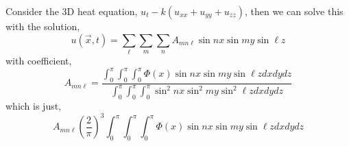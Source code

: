\begin{eg}
  Consider the $3$D heat equation, $u_t - k(u_{xx} + u_{yy} + u_{zz})$, then we can solve this with the solution,
  $$ u(\vec x, t) = \sum_\ell \sum_m \sum_n A_{mn\ell} \sin nx \sin my \sin \ell z $$
  with coefficient,
  $$ A_{mn\ell} = \frac{\int_0^\pi\int_0^\pi\int_0^\pi \Phi(x)\sin nx \sin my \sin \ell z dxdydz}{\int_0^\pi\int_0^\pi\int_0^\pi \sin^2 nx \sin^2 my \sin^2 \ell z dxdydz} $$
  which is just,
  $$ A_{mn\ell }\left( \frac{2}{\pi} \right)^3 \int_0^\pi\int_0^\pi\int_0^\pi \Phi(x) \sin nx \sin my \sin \ell z dxdydz$$
\end{eg}